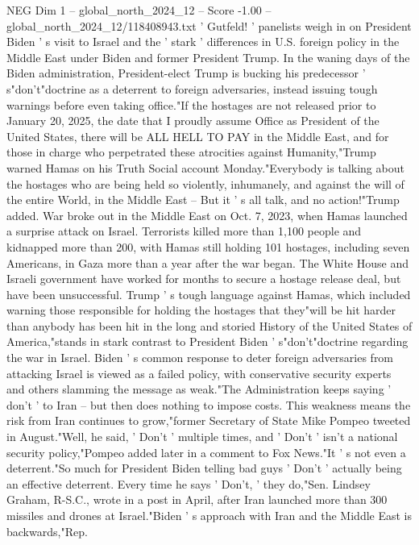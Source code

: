 \begin{textsample}{NEG Dim 1 – global\_north\_2024\_12 – Score -1.00 – global\_north\_2024\_12/118408943.txt}  \label{ex:f1_neg_221}
' Gutfeld! ' panelists weigh in on President Biden ' s visit to Israel and the ' stark ' differences in U.S. foreign policy in the Middle East under Biden and former President Trump.
In the waning days of the Biden administration, President-elect Trump is bucking his predecessor ' s"don't"doctrine as a deterrent to foreign adversaries, instead issuing tough warnings before even taking office."If the hostages are not released prior to January 20, 2025, the date that I proudly assume Office as President of the United States, there will be ALL HELL TO PAY in the Middle East, and for those in charge who perpetrated these atrocities against Humanity,"Trump warned Hamas on his Truth Social account Monday."Everybody is talking about the hostages who are being held so violently, inhumanely, and against the will of the entire World, in the Middle East -- But it ' s all talk, and no action!"Trump added.
War broke out in the Middle East on Oct. 7, 2023, when Hamas launched a surprise attack on Israel.
Terrorists killed more than 1,100 people and kidnapped more than 200, with Hamas still holding 101 hostages, including seven Americans, in Gaza more than a year after the war began.
The White House and Israeli government have worked for months to secure a hostage release deal, but have been unsuccessful.
Trump ' s tough language against Hamas, which included warning those responsible for holding the hostages that they"will be hit harder than anybody has been hit in the long and storied History of the United States of America,"stands in stark contrast to President Biden ' s"don't"doctrine regarding the war in Israel.
Biden ' s common response to deter foreign adversaries from attacking Israel is viewed as a failed policy, with conservative security experts and others slamming the message as weak."The Administration keeps saying ' don't ' to Iran -- but then does nothing to impose costs.
This weakness means the risk from Iran continues to grow,"former Secretary of State Mike Pompeo tweeted in August."Well, he said, ' Don't ' multiple times, and ' Don't ' isn't a national security policy,"Pompeo added later in a comment to Fox News."It ' s not even a deterrent."So much for President Biden telling bad guys ' Don't ' actually being an effective deterrent.
Every time he says ' Don't, ' they do,"Sen.
Lindsey Graham, R-S.C., wrote in a post in April, after Iran launched more than 300 missiles and drones at Israel."Biden ' s approach with Iran and the Middle East is backwards,"Rep.

\end{textsample}
